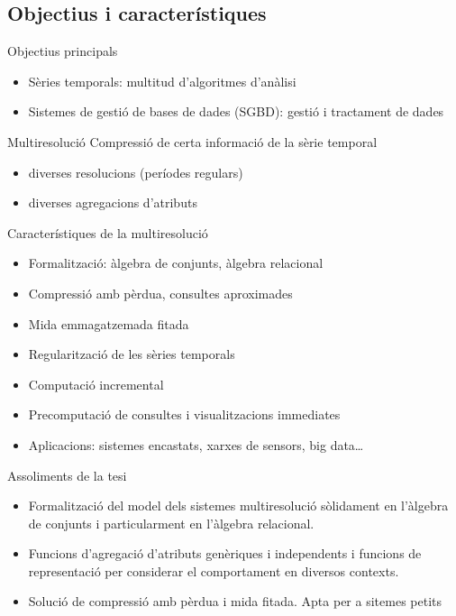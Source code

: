 \subsection{Objectius i característiques}
\begin{frame}{Objectius principals}

  \begin{itemize}
  \item Sèries temporals: multitud d'algoritmes d'anàlisi
  \item Sistemes de gestió de bases de dades (SGBD): gestió i tractament de dades
  \end{itemize} 

\begin{block}{Multiresolució}
  Compressió de certa informació de la sèrie temporal
    \begin{itemize}
    \item diverses resolucions (períodes regulars)
    \item diverses agregacions d'atributs 
    \end{itemize}
\end{block}


\end{frame}


\begin{frame}{Característiques de la multiresolució}

  \begin{itemize}
  \item Formalització: àlgebra de conjunts, àlgebra relacional
  \item Compressió amb pèrdua, consultes aproximades
  \item Mida emmagatzemada fitada
  \item Regularització de les sèries temporals
  \item Computació incremental
  \item Precomputació de consultes i visualitzacions immediates
  \item Aplicacions: sistemes encastats, xarxes de sensors, big data\dots
  \end{itemize}

\end{frame}


\begin{frame}{Assoliments de la tesi}

  \begin{itemize}
  \item Formalització del model dels sistemes multiresolució sòlidament en l’àlgebra de conjunts i particularment en l’àlgebra relacional.
  \item Funcions d’agregació d’atributs genèriques i independents i funcions de representació per considerar el comportament en diversos contexts.
  \item Solució de compressió amb pèrdua i mida fitada. Apta per a sitemes petits
  \end{itemize}

\end{frame}



